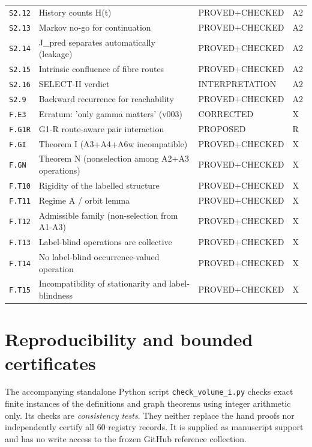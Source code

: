 \documentclass[11pt,oneside,openany]{book}
\theoremstyle{definition}
\theoremstyle{remark}
\begin{document}
\begin{longtable}{@{}p{16mm}p{59mm}p{38mm}p{13mm}@{}}
\texttt{S2.12} & History counts H(t) & PROVED+CHECKED & A2 \\
\texttt{S2.13} & Markov no-go for continuation & PROVED+CHECKED & A2 \\
\texttt{S2.14} & J\_pred separates automatically (leakage) & PROVED+CHECKED & A2 \\
\texttt{S2.15} & Intrinsic confluence of fibre routes & PROVED+CHECKED & A2 \\
\texttt{S2.16} & SELECT-II verdict & INTERPRETATION & A2 \\
\texttt{S2.9} & Backward recurrence for reachability & PROVED+CHECKED & A2 \\
\texttt{F.E3} & Erratum: 'only gamma matters' (v003) & CORRECTED & X \\
\texttt{F.G1R} & G1-R route-aware pair interaction & PROPOSED & R \\
\texttt{F.GI} & Theorem I (A3+A4+A6w incompatible) & PROVED+CHECKED & X \\
\texttt{F.GN} & Theorem N (nonselection among A2+A3 operations) & PROVED+CHECKED & X \\
\texttt{F.T10} & Rigidity of the labelled structure & PROVED+CHECKED & X \\
\texttt{F.T11} & Regime A / orbit lemma & PROVED+CHECKED & X \\
\texttt{F.T12} & Admissible family (non-selection from A1-A3) & PROVED+CHECKED & X \\
\texttt{F.T13} & Label-blind operations are collective & PROVED+CHECKED & X \\
\texttt{F.T14} & No label-blind occurrence-valued operation & PROVED+CHECKED & X \\
\texttt{F.T15} & Incompatibility of stationarity and label-blindness & PROVED+CHECKED & X \\
\bottomrule
\end{longtable}
\normalsize
\chapter{Reproducibility and bounded certificates}\label{app:checks}
The accompanying standalone Python script \texttt{check\_volume\_i.py} checks exact finite instances of the definitions and graph theorems using integer arithmetic only. Its checks are \emph{consistency tests}. They neither replace the hand proofs nor independently certify all 60 registry records. It is supplied as manuscript support and has no write access to the frozen GitHub reference collection.
\end{document}
